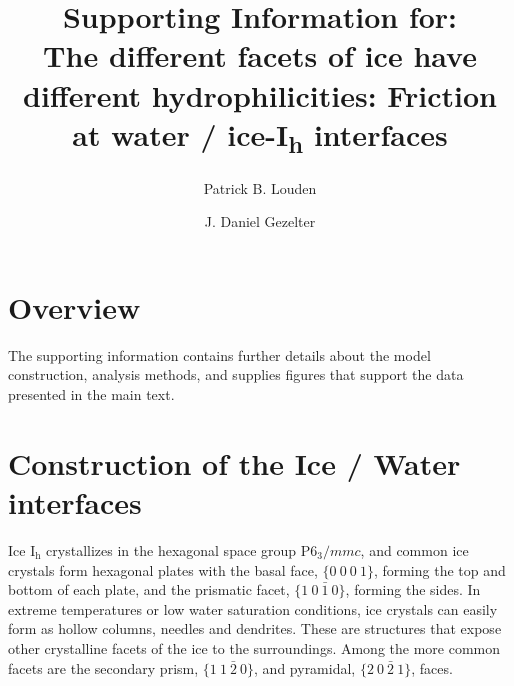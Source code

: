 \documentclass{pnastwo}
\begin{document}
\title{Supporting Information for: \\
The different facets of ice have different hydrophilicities: Friction at water /
  ice-I\textsubscript{h} interfaces}

\author{Patrick B. Louden
\and
J. Daniel Gezelter}


\maketitle

\begin{article}

\section{Overview}
The supporting information contains further details about the model
construction, analysis methods, and supplies figures that support the
data presented in the main text.

\section{Construction of the Ice / Water interfaces}
Ice I$_\mathrm{h}$ crystallizes in the hexagonal space group
P$6_3/mmc$, and common ice crystals form hexagonal plates with the
basal face, $\{0~0~0~1\}$, forming the top and bottom of each plate, and
the prismatic facet, $\{1~0~\bar{1}~0\}$, forming the sides.  In extreme
temperatures or low water saturation conditions, ice crystals can
easily form as hollow columns, needles and dendrites. These are
structures that expose other crystalline facets of the ice to the
surroundings.  Among the more common facets are the secondary prism,
$\{1~1~\bar{2}~0\}$, and pyramidal, $\{2~0~\bar{2}~1\}$, faces.  


\end{article}
\end{document}
